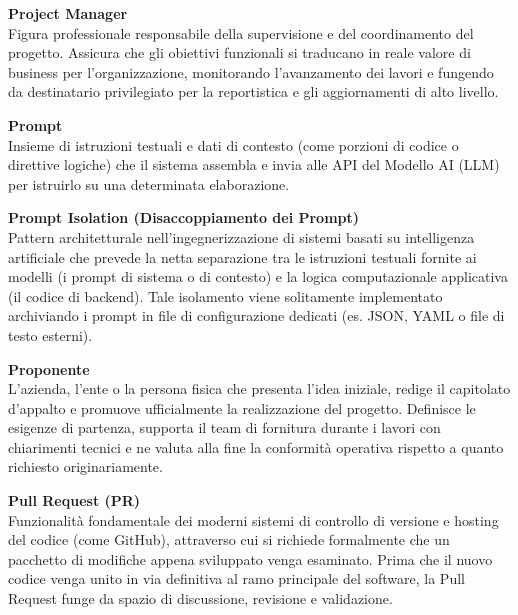 \documentclass[12pt, a4paper]{article}
\begin{document}
\noindent\hypertarget{project-manager}{\textbf{Project Manager}} \\[0.1em]
Figura professionale responsabile della supervisione e del coordinamento del progetto. Assicura che gli obiettivi funzionali si traducano in reale valore di business per l'organizzazione, monitorando l'avanzamento dei lavori e fungendo da destinatario privilegiato per la reportistica e gli aggiornamenti di alto livello.
\vspace{0.5cm}

\noindent\hypertarget{prompt}{\textbf{Prompt}} \\[0.1em]
Insieme di istruzioni testuali e dati di contesto (come porzioni di codice o direttive logiche) che il sistema assembla e invia alle API del Modello AI (LLM) per istruirlo su una determinata elaborazione.
\vspace{0.5cm}  

\noindent\hypertarget{prompt-isolation}{\textbf{Prompt Isolation (Disaccoppiamento dei Prompt)}} \\[0.1em]
Pattern architetturale nell'ingegnerizzazione di sistemi basati su intelligenza artificiale che prevede la netta separazione tra le istruzioni testuali fornite ai modelli (i prompt di sistema o di contesto) e la logica computazionale applicativa (il codice di backend). Tale isolamento viene solitamente implementato archiviando i prompt in file di configurazione dedicati (es. JSON, YAML o file di testo esterni).
\vspace{0.5cm}

\noindent\hypertarget{Proponente}{\textbf{Proponente}} \\[0.1em]
L'azienda, l'ente o la persona fisica che presenta l'idea iniziale, redige il capitolato d'appalto e promuove ufficialmente la realizzazione del progetto. Definisce le esigenze di partenza, supporta il team di fornitura durante i lavori con chiarimenti tecnici e ne valuta alla fine la conformità operativa rispetto a quanto richiesto originariamente.
\vspace{0.5cm}

\newpage
\noindent\hypertarget{pull-request}{\textbf{Pull Request (PR)}} \\[0.1em]
Funzionalità fondamentale dei moderni sistemi di controllo di versione e hosting del codice (come GitHub), attraverso cui si richiede formalmente che un pacchetto di modifiche appena sviluppato venga esaminato. Prima che il nuovo codice venga unito in via definitiva al ramo principale del software, la Pull Request funge da spazio di discussione, revisione e validazione.
\vspace{0.5cm}
\end{document}

